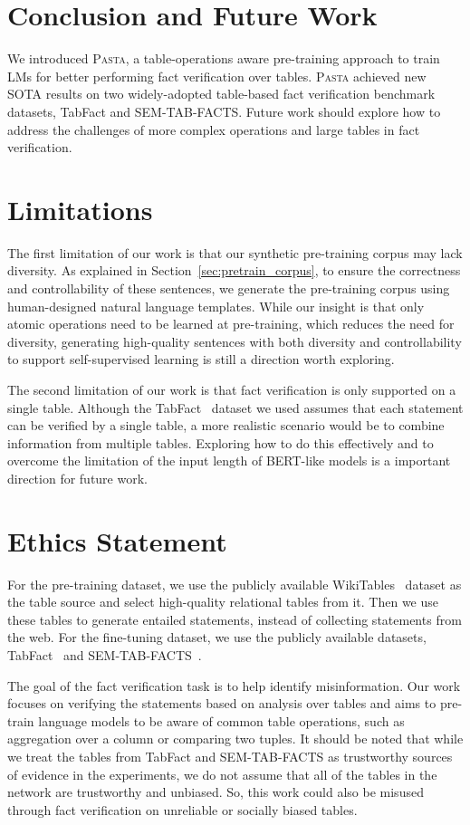 \documentclass[11pt]{article}
\newcommand{\pasta}{\textsc{Pasta}\xspace}
\newcommand{\stitle}[1]{\vspace{1mm}\noindent{\bf #1}}
\begin{document}
\fi \section{Conclusion and Future Work}


We introduced \pasta, a table-operations aware pre-training approach to train LMs for better performing fact verification over tables.
\pasta achieved new SOTA results on two widely-adopted table-based fact verification benchmark datasets, TabFact and SEM-TAB-FACTS.
Future work should explore how to address the challenges of more complex operations and large tables in fact verification.
 
\section*{Limitations}
The first limitation of our work is that our synthetic pre-training corpus may lack diversity. As explained in Section~\ref{sec:pretrain_corpus}, to ensure the correctness and controllability of these sentences, we generate the pre-training corpus using human-designed natural language templates. While our insight is that only atomic operations need to be learned at pre-training, which reduces the need for diversity, generating high-quality sentences with both diversity and controllability to support self-supervised learning is still a direction worth exploring. 

The second limitation of our work is that fact verification is only supported on a single table. Although the TabFact~\cite{tabfact} dataset we used assumes that each statement can be verified by a single table, a more realistic scenario would be to combine information from multiple tables. Exploring how to do this effectively and to overcome the limitation of the input length of BERT-like models is a important direction for future work.
 \section*{Ethics Statement}
\stitle{Dataset Collection} For the pre-training dataset, we use the publicly available WikiTables~\cite{wikitables} dataset as the table source and select high-quality relational tables from it. Then we use these tables to generate entailed statements, instead of collecting statements from the web. For the fine-tuning dataset, we use the publicly available datasets, TabFact~\cite{tabfact} and SEM-TAB-FACTS~\cite{semtabfact}. 

\stitle{Intended Use and Misuse Potential} The goal of the fact verification task is to help identify misinformation. Our work focuses on verifying the statements based on analysis over tables and aims to pre-train language models to be aware of common table operations, such as {aggregation} over a column or comparing two tuples. It should be noted that while we treat the tables from TabFact and SEM-TAB-FACTS as trustworthy sources of evidence in the experiments, we do not assume that all of the tables in the network are trustworthy and unbiased. So, this work could also be misused through fact verification on unreliable or socially biased tables. 
\end{document}
